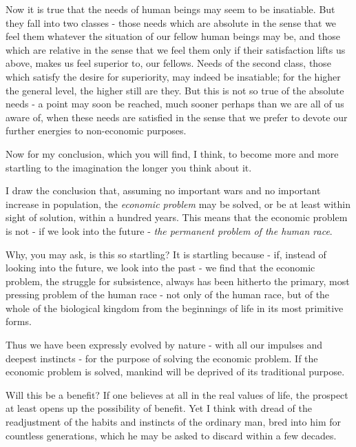 Now it is true that the needs of human beings may seem to be insatiable. But they fall into two classes - those needs which are absolute in the sense that we feel them whatever the situation of our fellow human beings may be, and those which are relative in the sense that we feel them only if their satisfaction lifts us above, makes us feel superior to, our fellows. Needs of the second class, those which satisfy the desire for superiority, may indeed be insatiable; for the higher the general level, the higher still are they. But this is not so true of the absolute needs - a point may soon be reached, much sooner perhaps than we are all of us aware of, when these needs are satisfied in the sense that we prefer to devote our further energies to non-economic purposes.\par

Now for my conclusion, which you will find, I think, to become more and more startling to the imagination the longer you think about it.\par

I draw the conclusion that, assuming no important wars and no important increase in population, the \textit{economic problem} may be solved, or be at least within sight of solution, within a hundred years. This means that the economic problem is not - if we look into the future - \textit{the permanent problem of the human race}.\par

Why, you may ask, is this so startling? It is startling because - if, instead of looking into the future, we look into the past - we find that the economic problem, the struggle for subsistence, always has been hitherto the primary, most pressing problem of the human race - not only of the human race, but of the whole of the biological kingdom from the beginnings of life in its most primitive forms.\par

Thus we have been expressly evolved by nature - with all our impulses and deepest instincts - for the purpose of solving the economic problem. If the economic problem is solved, mankind will be deprived of its traditional purpose.\par

Will this be a benefit? If one believes at all in the real values of life, the prospect at least opens up the possibility of benefit. Yet I think with dread of the readjustment of the habits and instincts of the ordinary man, bred into him for countless generations, which he may be asked to discard within a few decades.\par

